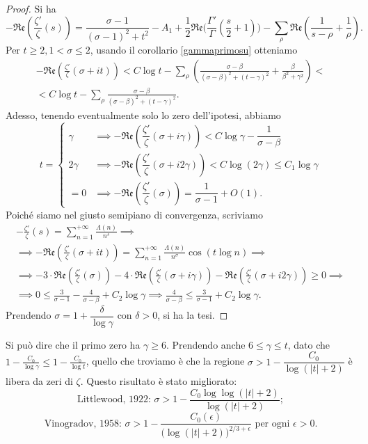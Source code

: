 \begin{proof}
  Si ha
  $$-\mathfrak{Re}\left(\frac{\zeta'}{\zeta}(s)\right)=\frac{\sigma-1}{(\sigma-1)^2+t^2}-A_1+\frac{1}{2}\mathfrak{Re}\Bigg(\frac{\Gamma'}{\Gamma}\left(\frac{s}{2}+1\right)\Bigg)-\sum_{\rho}\mathfrak{Re}\left(\frac{1}{s-\rho}+\frac{1}{\rho}\right).$$
  Per $t \ge 2, 1<\sigma \le 2$, usando il corollario \ref{gammaprimosu} otteniamo
  \begin{gather*}
    -\mathfrak{Re}\left(\frac{\zeta'}{\zeta}(\sigma+it)\right)<C\log{t}-\sum_{\rho} \left(\frac{\sigma-\beta}{(\sigma-\beta)^2+(t-\gamma)^2}+\frac{\beta}{\beta^2+\gamma^2}\right)< \\
    <C\log{t}-\sum_{\rho} \frac{\sigma-\beta}{(\sigma-\beta)^2+(t-\gamma)^2}.
  \end{gather*}
  Adesso, tenendo eventualmente solo lo zero dell'ipotesi, abbiamo
  $$t=\begin{cases}
    \gamma & \implies -\mathfrak{Re}\left(\dfrac{\zeta'}{\zeta}(\sigma+i\gamma)\right)<C\log{\gamma}-\dfrac{1}{\sigma-\beta} \\
    2\gamma & \implies -\mathfrak{Re}\left(\dfrac{\zeta'}{\zeta}(\sigma+i2\gamma)\right)<C\log(2\gamma) \le C_1\log{\gamma} \\
    =0 & \implies -\mathfrak{Re}\left(\dfrac{\zeta'}{\zeta}(\sigma)\right)=\dfrac{1}{\sigma-1}+O(1).
\end{cases}$$
Poiché siamo nel giusto semipiano di convergenza, scriviamo
\begin{gather*}
  -\frac{\zeta'}{\zeta}(s)=\sum_{n=1}^{+\infty} \frac{\Lambda(n)}{n^s} \implies \\
  \implies -\mathfrak{Re}\left(\frac{\zeta'}{\zeta}(\sigma+it)\right)=\sum_{n=1}^{+\infty} \frac{\Lambda(n)}{n^{\sigma}}\cos(t\log{n}) \implies \\
  \implies -3\cdot\mathfrak{Re}\left(\frac{\zeta'}{\zeta}(\sigma)\right)-4\cdot\mathfrak{Re}\left(\frac{\zeta'}{\zeta}(\sigma+i\gamma)\right)-\mathfrak{Re}\left(\frac{\zeta'}{\zeta}(\sigma+i2\gamma)\right) \ge 0 \implies \\
  \implies 0 \le \frac{3}{\sigma-1}-\frac{4}{\sigma-\beta}+C_2\log{\gamma} \implies \frac{4}{\sigma-\beta} \le \frac{3}{\sigma-1}+C_2\log{\gamma}.
\end{gather*}
Prendendo $\sigma=1+\dfrac{\delta}{\log{\gamma}}$ con $\delta>0$, si ha la tesi.
\end{proof}

\begin{oss}
  Si può dire che il primo zero ha $\gamma \ge 6$. Prendendo anche $6 \le \gamma \le t$, dato che $1-\frac{C_0}{\log{\gamma}} \le 1-\frac{C_0}{\log{t}}$, quello che troviamo è che la regione $\sigma>1-\dfrac{C_0}{\log(|t|+2)}$ è libera da zeri di $\zeta$. Questo risultato è stato migliorato:
  $$\text{Littlewood, 1922: } \sigma>1-\frac{C_0\log\log(|t|+2)}{\log(|t|+2)};$$
  $$\text{Vinogradov, 1958: } \sigma>1-\frac{C_0(\epsilon)}{\big(\log(|t|+2)\big)^{2/3+\epsilon}} \text{ per ogni }\epsilon>0.$$
\end{oss}

